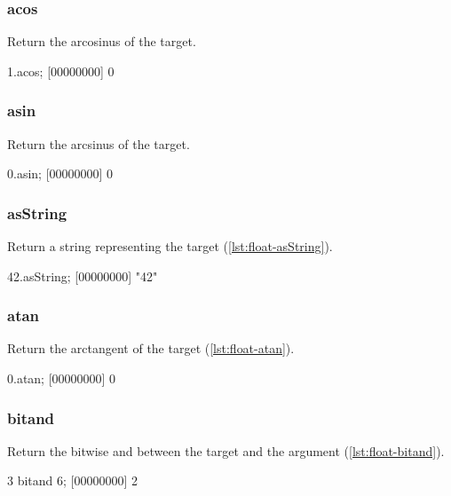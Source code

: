 \subsubsection{acos}

Return the arcosinus of the target.

\begin{urbiscript}[caption=Float.acos, label=lst:float-acos,
  float=\floatposh]
1.acos;
[00000000] 0
\end{urbiscript}

\subsubsection{asin}

Return the arcsinus of the target.

\begin{urbiscript}[caption=Float.asin, label=lst:float-asin,
  float=\floatposh]
0.asin;
[00000000] 0
\end{urbiscript}

\subsubsection{asString}

Return a string representing the target (\autoref{lst:float-asString}).

\begin{urbiscript}[caption=Float.asString, label=lst:float-asString,
  float=\floatposh]
42.asString;
[00000000] "42"
\end{urbiscript}

\subsubsection{atan}

Return the arctangent of the target (\autoref{lst:float-atan}).

\begin{urbiscript}[caption=Float.atan, label=lst:float-atan,
  float=\floatposh]
0.atan;
[00000000] 0
\end{urbiscript}

\subsubsection{bitand}

Return the bitwise and between the target and the argument (\autoref{lst:float-bitand}).

\begin{urbiscript}[caption=Float.bitand, label=lst:float-bitand,
  float=\floatposh]
3 bitand 6;
[00000000] 2
\end{urbiscript}

